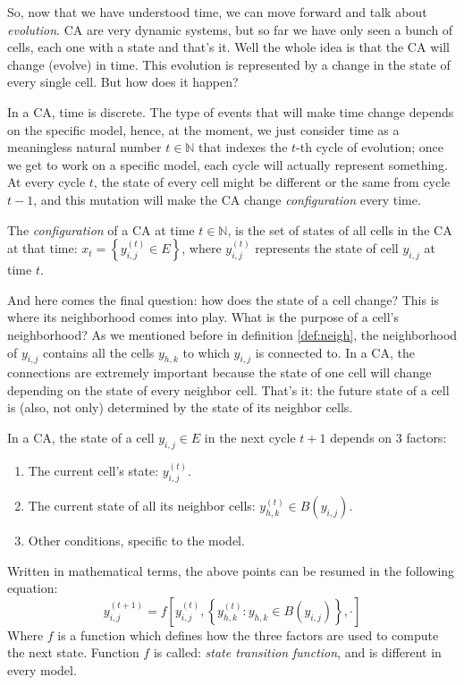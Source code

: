 So, now that we have understood time, we can move forward and talk about \textit{evolution}.
CA are very dynamic systems, but so far we have only seen a bunch of cells, each one with a state and
that's it. Well the whole idea is that the CA will change (evolve) in time. This evolution is
represented by a change in the state of every single cell. But how does it happen?

In a CA, time is discrete. The type of events that will make time change depends on the specific model,
hence, at the moment, we just consider time as a meaningless natural number $t \in \mathbb{N}$
that indexes the $t$-th cycle of evolution; once we get to work on a specific model, each cycle will
actually represent something.
At every cycle $t$,
the state of every cell might be different or the same from cycle $t-1$, and this mutation will make
the CA change \textit{configuration} every time.

\begin{definition}[CA configuration]
The \textit{configuration} of a CA at time $t \in \mathbb{N}$, is the set of states of all cells
in the CA at that time: $x_t = \left\{ y^{(t)}_{i,j} \in E \right\}$, where
$y^{(t)}_{i,j}$ represents the state of cell $y_{i,j}$ at time $t$.
\end{definition}

And here comes the final question: how does the state of a cell change? This is where its
neighborhood comes into play.
What is the purpose of a cell's neighborhood? As we mentioned before in definition \ref{def:neigh},
the neighborhood of $y_{i,j}$ contains all the cells $y_{h,k}$ to which $y_{i,j}$ is connected to.
In a CA, the connections are extremely important because the state of one cell will change depending
on the state of every neighbor cell. That's it: the future state of a cell is (also, not only)
determined by the state of its neighbor cells.

\begin{proposition}
In a CA, the state of a cell $y_{i,j} \in E$ in the next cycle $t+1$ depends on 3 factors:
\begin{enumerate}
\item The current cell's state: $y^{(t)}_{i,j}$.
\item The current state of all its neighbor cells: $y^{(t)}_{h,k} \in B\left( y_{i,j} \right)$.
\item Other conditions, specific to the model.
\end{enumerate}
Written in mathematical terms, the above points can be resumed in the following equation:
\begin{equation}
y^{(t+1)}_{i,j} = f \left[ y^{(t)}_{i,j}, 
    \left\{ y^{(t)}_{h,k} : y_{h,k} \in B\left( y_{i,j} \right) \right\}, \cdot \right]
\end{equation}
Where $f$ is a function which defines how the three factors are used to compute the next state.
Function $f$ is called: \textit{state transition function}, and is different in every model.
\end{proposition}

